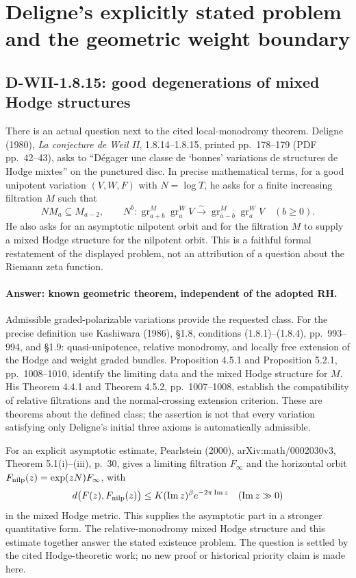 \section{Deligne's explicitly stated problem and the geometric weight boundary}
\label{sec:deligne-problem}

\subsection{D-WII-1.8.15: good degenerations of mixed Hodge structures}

There is an actual question next to the cited local-monodromy theorem.
Deligne (1980), \emph{La conjecture de Weil II}, 1.8.14--1.8.15,
printed pp.~178--179 (PDF pp.~42--43), asks to
``D\'egager une classe de `bonnes' variations de structures de Hodge mixtes''
on the punctured disc. In precise mathematical terms, for a good
unipotent variation $(V,W,F)$ with $N=\log T$, he asks for a finite
increasing filtration $M$ such that
\[
 NM_a\subseteq M_{a-2},\qquad
 N^b:\operatorname{gr}^{M}_{a+b}\operatorname{gr}^{W}_a V
       \xrightarrow{\sim}
       \operatorname{gr}^{M}_{a-b}\operatorname{gr}^{W}_a V
 \quad(b\geq0).
\]
He also asks for an asymptotic nilpotent orbit and for the filtration
$M$ to supply a mixed Hodge structure for the nilpotent orbit.
This is a faithful formal restatement of the displayed problem, not
an attribution of a question about the Riemann zeta function.

\paragraph{Answer: known geometric theorem, independent of the adopted RH.}
Admissible graded-polarizable variations provide the requested class.
For the precise definition use Kashiwara (1986), \S1.8,
conditions (1.8.1)--(1.8.4), pp.~993--994, and \S1.9: quasi-unipotence,
relative monodromy, and locally free extension of the Hodge and weight
graded bundles. Proposition 4.5.1 and Proposition 5.2.1,
pp.~1008--1010, identify the limiting data and the mixed Hodge
structure for $M$. His Theorem 4.4.1 and Theorem 4.5.2,
pp.~1007--1008, establish the compatibility of relative filtrations
and the normal-crossing extension criterion. These are theorems about
the defined class; the assertion is not that every variation satisfying
only Deligne's initial three axioms is automatically admissible.

For an explicit asymptotic estimate, Pearlstein (2000),
arXiv:math/0002030v3, Theorem 5.1(i)--(iii), p.~30,
gives a limiting filtration $F_\infty$ and the horizontal orbit
$F_{\rm nilp}(z)=\exp(zN)F_\infty$, with
\[
 d\bigl(F(z),F_{\rm nilp}(z)\bigr)
 \leq K(\operatorname{Im}z)^\beta
                  e^{-2\pi\operatorname{Im}z}
 \quad(\operatorname{Im}z\gg0)
\]
in the mixed Hodge metric. This supplies the asymptotic part in a
stronger quantitative form. The relative-monodromy mixed Hodge
structure and this estimate together answer the stated existence
problem. The question is settled by the cited Hodge-theoretic work;
no new proof or historical priority claim is made here.

